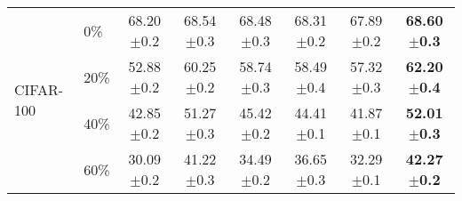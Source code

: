 \documentclass{article}
\begin{document}
\begin{table*}[!tb]
\begin{tabular}{ll|cccccc}
\hline
\multirow{4}{*}{CIFAR-100}
& 0\% & 68.20$\pm$0.2 & 68.54$\pm$0.3 & 68.48$\pm$0.3 & 68.31$\pm$0.2 & 67.89$\pm$0.2 & \textbf{68.60$\pm$0.3}  \\
& 20\% & 52.88$\pm$0.2  & 60.25$\pm$0.2 & 58.74$\pm$0.3 & 58.49$\pm$0.4 & 57.32$\pm$0.3 & \textbf{62.20$\pm$0.4}  \\
& 40\% & 42.85$\pm$0.2  & 51.27$\pm$0.3 & 45.42$\pm$0.2 & 44.41$\pm$0.1 & 41.87$\pm$0.1 & \textbf{52.01$\pm$0.3}  \\
& 60\% & 30.09$\pm$0.2  & 41.22$\pm$0.3 & 34.49$\pm$0.2 & 36.65$\pm$0.3 & 32.29$\pm$0.1 & \textbf{42.27$\pm$0.2}  \\
\hline
\end{tabular}
\end{table*}
\end{document}
